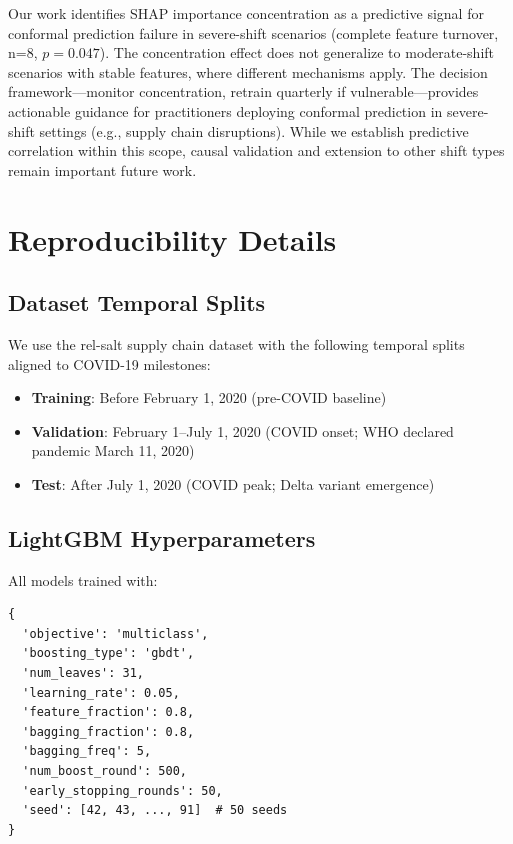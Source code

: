 \documentclass[sigconf]{acmart}
\begin{document}
Our work identifies SHAP importance concentration as a predictive signal for conformal prediction failure in severe-shift scenarios (complete feature turnover, n=8, $p=0.047$). The concentration effect does not generalize to moderate-shift scenarios with stable features, where different mechanisms apply. The decision framework---monitor concentration, retrain quarterly if vulnerable---provides actionable guidance for practitioners deploying conformal prediction in severe-shift settings (e.g., supply chain disruptions). While we establish predictive correlation within this scope, causal validation and extension to other shift types remain important future work.

\appendix

\section{Reproducibility Details}
\label{app:reproducibility}

\subsection{Dataset Temporal Splits}

We use the rel-salt supply chain dataset with the following temporal splits
aligned to COVID-19 milestones:

\begin{itemize}
    \item \textbf{Training}: Before February 1, 2020 (pre-COVID baseline)
    \item \textbf{Validation}: February 1--July 1, 2020 (COVID onset; WHO
    declared pandemic March 11, 2020)
    \item \textbf{Test}: After July 1, 2020 (COVID peak; Delta variant emergence)
\end{itemize}

\subsection{LightGBM Hyperparameters}

All models trained with:

\begin{verbatim}
{
  'objective': 'multiclass',
  'boosting_type': 'gbdt',
  'num_leaves': 31,
  'learning_rate': 0.05,
  'feature_fraction': 0.8,
  'bagging_fraction': 0.8,
  'bagging_freq': 5,
  'num_boost_round': 500,
  'early_stopping_rounds': 50,
  'seed': [42, 43, ..., 91]  # 50 seeds
}
\end{verbatim}
\end{document}
